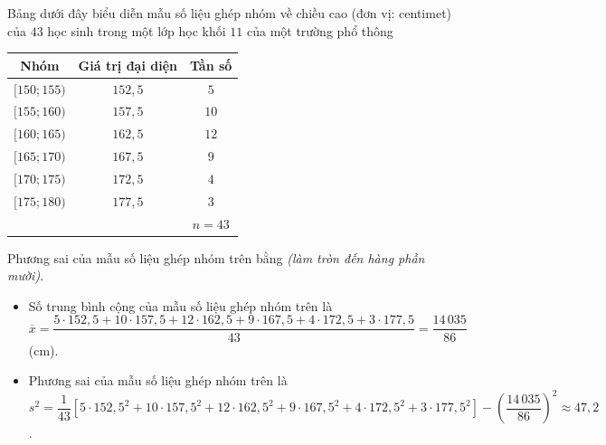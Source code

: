 \begin{ex}%
	Bảng dưới đây biểu diễn mẫu số liệu ghép nhóm về chiều cao (đơn vị: centimet) của $43$ học sinh trong một lớp học khối $11$ của một trường phổ thông
	\begin{center}
		\begin{tabular}{|c|c|c|}
			\hline
			Nhóm & Giá trị đại diện & Tần số \\
			\hline
			$[150;155)$ & $152{,}5$ & $5$ \\
			\hline
			$[155;160)$ & $157{,}5$ & $10$ \\
			\hline
			$[160;165)$ & $162{,}5$ & $12$ \\
			\hline
			$[165;170)$ & $167{,}5$ & $9$ \\
			\hline
			$[170;175)$ & $172{,}5$ & $4$ \\
			\hline
			$[175;180)$ & $177{,}5$ & $3$ \\
			\hline
			& & $n=43$ \\
			\hline
		\end{tabular}
	\end{center}
	Phương sai của mẫu số liệu ghép nhóm trên bằng \textit{(làm tròn đến hàng phần mười)}.
	
	\loigiai
	{
		\begin{itemize}
			\item Số trung bình cộng của mẫu số liệu ghép nhóm trên là\\
			$\overline{x}=\dfrac{5\cdot 152{,}5+10\cdot 157{,}5+12\cdot 162{,}5+9\cdot 167{,}5+4\cdot 172{,}5+3\cdot 177{,}5}{43} =\dfrac {14\,035}{86}$ (cm). 
			\item Phương sai của mẫu số liệu ghép nhóm trên là\\		
			$s^2=\dfrac{1}{43} \left[5\cdot 152{,}5^2+10\cdot 157{,}5^2+12\cdot 162{,}5^2+9\cdot 167{,}5^2+4\cdot 172{,}5^2+3\cdot 177{,}5^2\right]-\left(\dfrac {14\,035}{86}\right)^2\approx 47{,}2$.
		\end{itemize}
	}
\end{ex}


